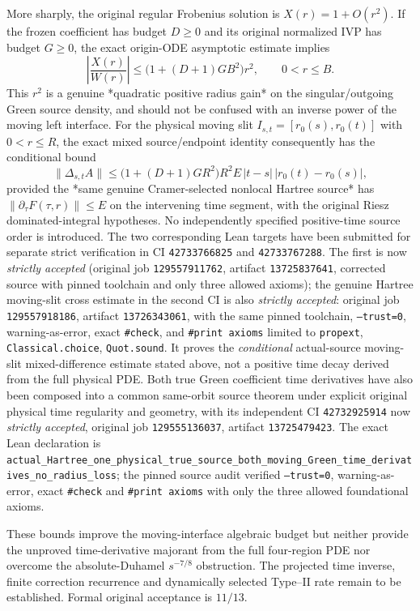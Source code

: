 \documentclass[11pt]{amsart}
\begin{document}
More sharply, the original regular Frobenius solution is
\(X(r)=1+O(r^2)\).  If the frozen coefficient has budget \(D\ge0\)
and its original normalized IVP has budget \(G\ge0\), the exact
origin-ODE asymptotic estimate implies
\[
 \left|\frac{X(r)}{W(r)}\right|
 \le \bigl(1+(D+1)GB^2\bigr)r^2,\qquad 0<r\le B.
\]
This \(r^2\) is a genuine *quadratic positive radius gain*
on the singular/outgoing Green source density, and should not be
confused with an inverse power of the moving left interface.
For the physical moving slit
\(I_{s,t}=[r_0(s),r_0(t)]\) with \(0<r\le R\), the exact mixed
source/endpoint identity consequently has the conditional bound
\[
 \|\Delta_{s,t}A\|
 \le \bigl(1+(D+1)GR^2\bigr)R^2 E\,
        |t-s|\,|r_0(t)-r_0(s)|,
\]
provided the *same genuine Cramer-selected nonlocal Hartree source*
has \(\|\partial_\tau F(\tau,r)\|\le E\) on the intervening
time segment, with the original Riesz dominated-integral hypotheses.
No independently specified positive-time source order is introduced.
The two corresponding Lean targets have been submitted for separate
strict verification in CI \texttt{42733766825} and
\texttt{42733767288}. The first is now \emph{strictly accepted}
(original job \texttt{129557911762}, artifact \texttt{13725837641},
corrected source with pinned toolchain and only three allowed axioms);
the genuine Hartree moving-slit cross estimate in
the second CI is also \emph{strictly accepted}: original job
\texttt{129557918186}, artifact \texttt{13726343061},
with the same pinned toolchain, \texttt{--trust=0},
warning-as-error, exact \texttt{\#check}, and \texttt{\#print axioms}
limited to \texttt{propext}, \texttt{Classical.choice},
\texttt{Quot.sound}. It proves the \emph{conditional} actual-source
moving-slit mixed-difference estimate stated above, not a positive
time decay derived from the full physical PDE. Both true Green coefficient
time derivatives have also been composed into a common
same-orbit source theorem under explicit original physical
time regularity and geometry, with its independent
CI \texttt{42732925914} now \emph{strictly accepted},
original job \texttt{129555136037}, artifact
\texttt{13725479423}. The exact Lean declaration is
\texttt{actual\_Hartree\_one\_physical\_true\_source\_both\_moving\_Green\_time\_derivatives\_no\_radius\_loss};
the pinned source audit verified \texttt{--trust=0},
warning-as-error, exact \texttt{\#check} and
\texttt{\#print axioms} with only the three allowed foundational
axioms.

These bounds improve the moving-interface algebraic budget but
neither provide the unproved time-derivative majorant from
the full four-region PDE nor overcome the absolute-Duhamel
\(s^{-7/8}\) obstruction. The projected time inverse, finite
correction recurrence and dynamically selected Type--II rate
remain to be established. Formal original acceptance is \(11/13\).
\end{document}
